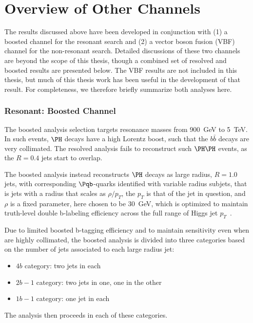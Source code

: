 \chapter{Overview of Other \bbbb Channels}
\label{app:other-channels}
The results discussed above have been developed in conjunction with (1) a boosted channel 
for the resonant search and (2) a vector boson fusion (VBF) channel for the non-resonant search. 
Detailed discussions of these two channels are beyond the scope of this thesis, though a 
combined set of resolved and boosted results are presented below. The VBF results are 
not included in this thesis, but much of this thesis work has been useful in the development 
of that result. For completeness, we therefore briefly summarize both analyses here.

\subsection{Resonant: Boosted Channel}
The boosted analysis selection targets resonance masses from \SI{900}{\GeV} to \SI{5}{\TeV}.
In such events, $\higgs$ decays have a high Lorentz boost, such that the $b\bar{b}$ decays are
very collimated. The resolved analysis fails to reconstruct such $\higgs\higgs$ events, as the 
$R=0.4$ jets start to overlap. 

The boosted analysis instead reconstructs $\higgs$ decays as large radius, $R=1.0$ jets, with 
corresponding $\Pqb$-quarks identified with variable radius subjets, that is jets with a 
radius that scales as $\rho / p_{T}$, the $p_{T}$ is that of the jet in question, and
$\rho$ is a fixed parameter, here chosen to be \SI{30}{\GeV}, which is optimized to maintain 
truth-level double b-labeling efficiency across the full range of Higgs jet $p_{T}$~\cite{ATL-PHYS-PUB-2017-010}.

Due to limited boosted b-tagging efficiency and to maintain sensitivity 
even when \bjets are highly collimated, the boosted analysis is divided into three categories 
based on the number of \btagged jets associated to each large radius jet:
\begin{itemize}
	\item $4b$ category: two \btagged jets in each
	\item $2b-1$ category: two \btagged jets in one, one in the other
	\item $1b-1$ category: one \btagged jet in each
\end{itemize} 

The analysis then proceeds in each of these categories.

